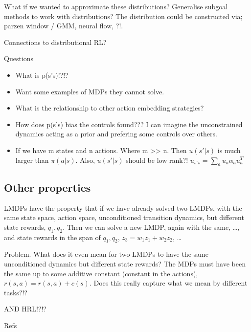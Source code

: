 What if we wanted to approximate these distributions? Generalise subgoal
methods to work with distributions? The distribution could be
constructed via; parzen window / GMM, neural flow, ?!.

Connections to distributional RL?

Questions

\begin{itemize}
\tightlist
\item
  What is p(s'\textbar{}s)!?!?
\item
  Want some examples of MDPs they cannot solve.
\item
  What is the relationship to other action embedding strategies?
\item
  How does p(s'\textbar{}s) bias the controls found??? I can imagine the
  unconstrained dynamics acting as a prior and prefering some controls
  over others.
\item
  If we have m states and n actions. Where m
  \textgreater{}\textgreater{} n. Then \(u(s'|s)\) is much larger than
  \(\pi(a|s)\). Also, \(u(s'|s)\) should be low rank?!
  \(u_{s's} = \sum_a u_a \alpha_a u_a^T\)
\end{itemize}

\subsection{Other properties}

LMDPs have the property that if we have already solved two LMDPs, with
the same state space, action space, unconditioned transition dynamics,
but different state rewards, \(q_1, q_2\). Then we can solve a new LMDP,
again with the same, \ldots{}, and state rewards in the span of
\(q_1, q_2\), \(z_3 = w_1 z_1 + w_2 z_2\), \ldots{}

Problem. What does it even mean for two LMDPs to have the same
unconditioned dynamics but different state rewards? The MDPs must have
been the same up to some additive constant (constant in the actions),
\(r(s, a)=r(s, a) + c(s)\). Does this really capture what we mean by
different tasks?!?

AND HRL!?!?

Refs \cite{Todorov2006,Todorov2009,Zhong,Zhonga,Dvijotham,Wozabal}



